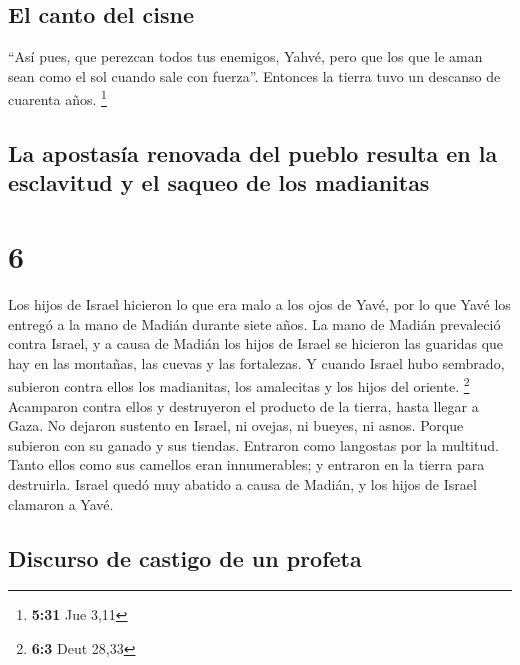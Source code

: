 \hypertarget{el-canto-del-cisne}{%
\subsection{El canto del cisne}\label{el-canto-del-cisne}}

 ``Así pues, que perezcan todos tus enemigos, Yahvé, pero
que los que le aman sean como el sol cuando sale con fuerza''. Entonces
la tierra tuvo un descanso de cuarenta años. \footnote{\textbf{5:31} Jue
  3,11}

\hypertarget{la-apostasuxeda-renovada-del-pueblo-resulta-en-la-esclavitud-y-el-saqueo-de-los-madianitas}{%
\subsection{La apostasía renovada del pueblo resulta en la esclavitud y
el saqueo de los
madianitas}\label{la-apostasuxeda-renovada-del-pueblo-resulta-en-la-esclavitud-y-el-saqueo-de-los-madianitas}}

\hypertarget{section-5}{%
\section{6}\label{section-5}}

 Los hijos de Israel hicieron lo que era malo a los ojos
de Yavé, por lo que Yavé los entregó a la mano de Madián durante siete
años.  La mano de Madián prevaleció contra Israel, y a
causa de Madián los hijos de Israel se hicieron las guaridas que hay en
las montañas, las cuevas y las fortalezas.  Y cuando
Israel hubo sembrado, subieron contra ellos los madianitas, los
amalecitas y los hijos del oriente. \footnote{\textbf{6:3} Deut 28,33}
 Acamparon contra ellos y destruyeron el producto de la
tierra, hasta llegar a Gaza. No dejaron sustento en Israel, ni ovejas,
ni bueyes, ni asnos.  Porque subieron con su ganado y sus
tiendas. Entraron como langostas por la multitud. Tanto ellos como sus
camellos eran innumerables; y entraron en la tierra para destruirla.
 Israel quedó muy abatido a causa de Madián, y los hijos
de Israel clamaron a Yavé.

\hypertarget{discurso-de-castigo-de-un-profeta}{%
\subsection{Discurso de castigo de un
profeta}\label{discurso-de-castigo-de-un-profeta}}

